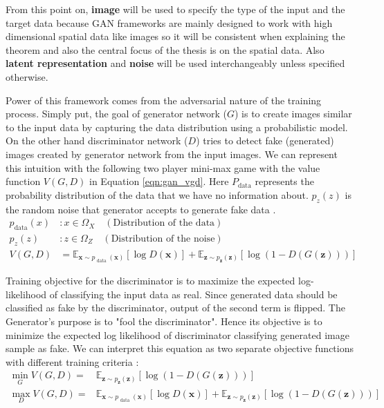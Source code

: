 From this point on, \textbf{image} will be used to specify the type of the input and the target data because
GAN frameworks are mainly designed to work with high dimensional spatial data like images so it will
be consistent when explaining the theorem and also the central focus of the thesis is on the spatial
data. Also \textbf{latent representation} and \textbf{noise} will be used interchangeably unless specified otherwise.

Power of this framework comes from the adversarial nature of the training process. Simply put,
the goal of generator network ($G$) is to create images similar to the input data by capturing the
data distribution using a probabilistic model. On the other hand discriminator network ($D$) tries to detect fake
(generated) images created by generator network from the input images. We can represent this intuition 
with the following two player mini-max game with the value function $V(G,D)$ in Equation \ref{eqn:gan_vgd}. 
Here $P_{\text{data}}$ represents the probability distribution of the data that we have no information about. 
$p_z(z)$ is the random noise that generator accepts to generate fake data 
\cite{Goodfellow:2014:GAN:2969033.2969125}.
\begin{align}
    p_{\text{data}} (x) & : x \in \Omega_{X} \quad (\text{Distribution of the data})\\[5pt]
    p_z (z) & : z \in \Omega_{Z} \quad (\text{Distribution of the noise}) \\[5pt]
    \label{eqn:gan_vgd}
    V(G, D) &= \mathbb{E}_{\boldsymbol{x} \sim p_{\text { data }}(\boldsymbol{x})}[\log D(\boldsymbol{x})]+\mathbb{E}_{\boldsymbol{z} \sim p_{\boldsymbol{z}}(\boldsymbol{z})}[\log (1-D(G(\boldsymbol{z})))]
\end{align}

Training objective for the discriminator is to maximize the expected log-likelihood of
classifying the input data as real.
Since generated data should be classified as fake by the discriminator, output of the second
term is flipped. The Generator's purpose is to "fool the discriminator". Hence its objective
is to minimize the expected log likelihood of discriminator classifying generated image sample as
fake. We can interpret this equation as two separate objective functions with different training
criteria :
\begin{align}
    \min _{G} V(G, D)=& \mathbb{E}_{\boldsymbol{z} \sim p_{\boldsymbol{z}}(\boldsymbol{z})}[\log (1-D(G(\boldsymbol{z})))] \\[5pt]
    \max _{D} V(G, D)=& \mathbb{E}_{\boldsymbol{x} \sim p_{\text { data }}(\boldsymbol{x})}[\log D(\boldsymbol{x})]+\mathbb{E}_{\boldsymbol{z} \sim p_{\boldsymbol{z}}(\boldsymbol{z})}[\log (1-D(G(\boldsymbol{z})))]
\end{align}

